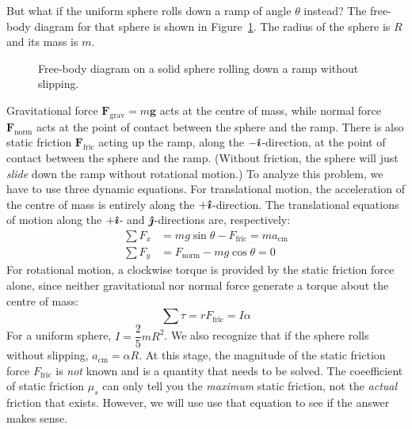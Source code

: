 But what if the uniform sphere rolls down a ramp of angle $\theta$ instead? The
free-body diagram for that sphere is shown in Figure~\ref{roll-ramp}. The radius
of the sphere is $R$ and its mass is $m$.
\begin{figure}[!ht]
  \centering
  \caption{Free-body diagram on a solid sphere rolling down a ramp without
    slipping.}
  \label{roll-ramp}
\end{figure}

Gravitational force $\bm F_\text{grav}=m\bm g$ acts at the centre of mass, while
normal force $\bm F_\text{norm}$ acts at the point of contact between the sphere
and the ramp. There is also static friction $\bm F_\text{fric}$ acting up the
ramp, along the $-\bm{\hat\imath}$-direction, at the point of contact between the sphere
and the ramp. (Without friction, the sphere will just \emph{slide} down the ramp
without rotational motion.) To analyze this problem, we have to use three
dynamic equations. For translational motion, the acceleration of the centre of
mass is entirely along the $+\bm{\hat\imath}$-direction. The translational equations of
motion along the $+\bm{\hat\imath}$- and $\bm{\hat\jmath}$-directions are, respectively:
\begin{align}
  \sum F_x&=mg\sin\theta-F_\text{fric}=ma_\text{cm}\\ \label{f_x}
  \sum F_y&=F_\text{norm}-mg\cos\theta=0
\end{align}
For rotational motion, a clockwise torque is provided by the static friction
force alone, since neither gravitational nor normal force generate a torque
about the centre of mass:
\begin{equation}
  \sum\tau=rF_\text{fric}=I\alpha
  \label{tau}
\end{equation}
For a uniform sphere, $I=\dfrac25mR^2$. We also recognize that if the sphere
rolls without slipping, $a_\text{cm}=\alpha R$. At this stage, the magnitude of
the static friction force $F_\text{fric}$ is \emph{not} known and is a quantity
that needs to be solved. The coeefficient of static friction $\mu_s$ can only
tell you the \emph{maximum} static friction, not the \emph{actual} friction
that exists. However, we will use use that equation to see if the answer makes
sense.

